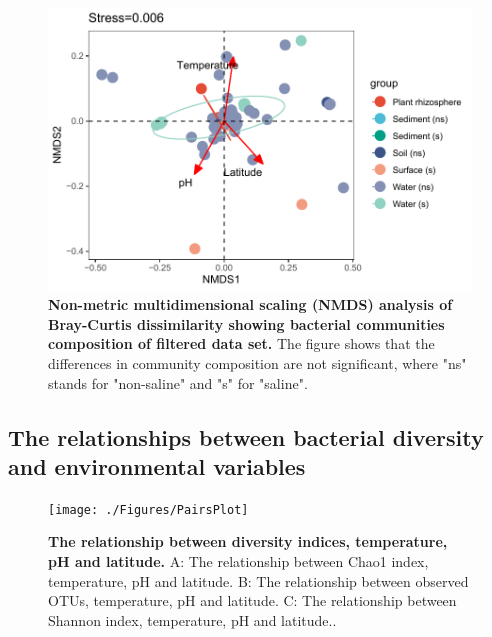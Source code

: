 \begin{figure}[H]
    \centering
    \includegraphics[scale=1]{./Figures/nmds_envfit_empo3}
    \caption{\textbf{Non-metric multidimensional scaling (NMDS) analysis of Bray-Curtis dissimilarity showing bacterial communities composition of filtered data set.} The figure shows that the differences in community composition are not significant, where "ns" stands for "non-saline" and "s" for "saline".}
    \label{fig:nmds}
\end{figure}

\subsection{The relationships between bacterial diversity and environmental variables}

\begin{figure}[H]
    \centering
    \texttt{[image: ./Figures/PairsPlot]}
    \caption{\textbf{The relationship between diversity indices, temperature, pH and latitude.} A: The relationship between Chao1 index, temperature, pH and latitude. B: The relationship between observed OTUs, temperature, pH and latitude. C: The relationship between Shannon index, temperature, pH and latitude..}
    \label{fig:Pairs}
\end{figure}


